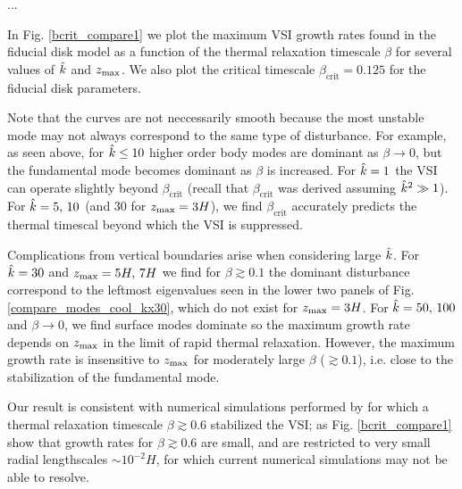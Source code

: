 ...

In Fig. \ref{bcrit_compare1} we plot the maximum VSI growth rates
found in the fiducial disk model as a function of the thermal
relaxation timescale $\beta$ for several values of $\hat{k}$ and
$z_\mathrm{max}$. We also plot the critical timescale
$\beta_\mathrm{crit}=0.125$ for the fiducial disk parameters.   

Note that the curves are not neccessarily smooth because the most unstable
mode may not always correspond to the same type of disturbance. For example,
as seen above, for $\hat{k} \leq 10$ higher order body modes are
dominant as $\beta\to 0$, but the fundamental 
mode becomes dominant as $\beta$ is increased. For $\hat{k}=1$ the VSI
can operate slightly beyond $\beta_\mathrm{crit}$  (recall that
$\beta_\mathrm{crit}$ was derived assuming $\hat{k}^2\gg 1$). For
$\hat{k}=5,\,10$ (and $30$ for $z_\mathrm{max}=3H$), we find
$\beta_\mathrm{crit}$ accurately predicts the thermal timescal beyond
which the VSI is suppressed.   

Complications from vertical boundaries arise when considering large
$\hat{k}$. For $\hat{k}=30$ and $z_\mathrm{max}=5H,\,7H$ we find for $\beta\gtrsim
0.1$ the dominant disturbance correspond to the leftmost eigenvalues 
seen in the lower two panels of Fig. \ref{compare_modes_cool_kx30},
which do not exist for $z_\mathrm{max}=3H$. For $\hat{k}=50,\,100$ and
$\beta\to0$, we find surface modes dominate so the maximum growth rate
depends on $z_\mathrm{max}$ in the limit of rapid thermal relaxation. 
However, the maximum growth rate is insensitive to 
$z_\mathrm{max}$ for moderately large $\beta$ ($\gtrsim 0.1$), i.e. close to
the stabilization of the fundamental mode.  

Our result is consistent with numerical simulations performed by
 for which a thermal relaxation timescale $\beta\gtrsim
0.6$ stabilized the VSI; as Fig. \ref{bcrit_compare1} show that growth
rates for $\beta\gtrsim 0.6$ are small, and are restricted to very
small radial lengthscales $\sim 10^{-2}H$, for which current numerical
simulations may not be able to resolve.

